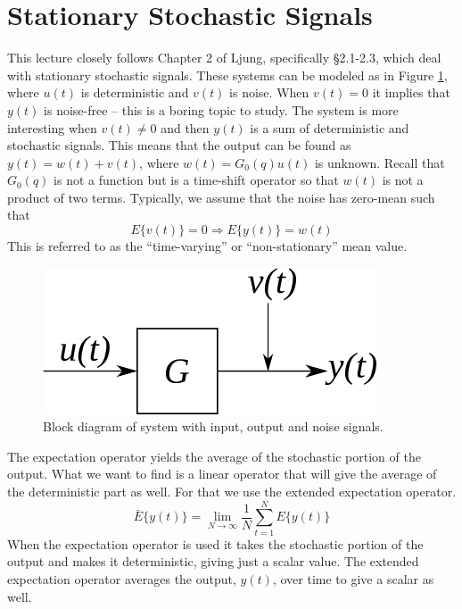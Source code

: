 
\mainmatter
\setcounter{page}{1}

\lectureseries[\course]{\course}

\date{October 6, 2009}

\setaddress

\setcounter{lecture}{3}
\setcounter{chapter}{3}


\section{Stationary Stochastic Signals}
This lecture closely follows Chapter 2 of Ljung, specifically \S2.1-2.3, which deal with stationary stochastic signals. These systems can be modeled as in Figure \ref{fig:04system}, where $u(t)$ is deterministic and $v(t)$ is noise. When $v(t)=0$ it implies that $y(t)$ is noise-free -- this is a boring topic to study. The system is more interesting when $v(t)\neq 0$ and then $y(t)$ is a sum of deterministic and stochastic signals. This means that the output can be found as $y(t)=w(t)+v(t)$, where $w(t)=G_0(q)u(t)$ is unknown. Recall that $G_0(q)$ is not a function but is a time-shift operator so that $w(t)$ is not a product of two terms. Typically, we assume that the noise has zero-mean such that
$$E\{v(t)\}=0 \Rightarrow E\{y(t)\}=w(t)$$
This is referred to as the ``time-varying'' or ``non-stationary'' mean value.
\begin{figure}[ht!]
	\centering
	\includegraphics[width=.3\textwidth]{images/04system}
	\caption{Block diagram of system with input, output and noise signals.}
	\label{fig:04system}
\end{figure}

The expectation operator yields the average of the stochastic portion of the output. What we want to find is a linear operator that will give the average of the deterministic part as well. For that we use the extended expectation operator.
$$\bar{E}\{y(t)\} = \lim_{N\to\infty}\frac{1}{N}\sum_{t=1}^NE\{y(t)\}$$
When the expectation operator is used it takes the stochastic portion of the output and makes it deterministic, giving just a scalar value. The extended expectation operator averages the output, $y(t)$, over time to give a scalar as well.


